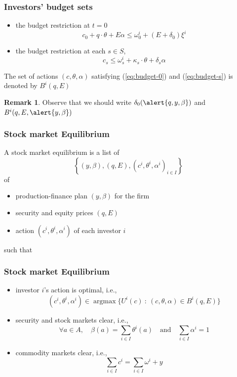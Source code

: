 \documentclass[blue]{beamer}
\def\leq{\leqslant}
\def\et{\quad \textrm{and} \quad}
\DeclareMathOperator\argmax{argmax}
\theoremstyle{definition}
\theoremstyle{example}
\newtheorem*{remark}{Remark}
\begin{document}

\begin{frame}\frametitle{Investors' budget sets}

\begin{itemize}
\item the budget restriction at $t=0$
\begin{equation}\label{eq:budget-0}
c_0 + q\cdot \theta + E \alpha \leq \omega^i_0 + (E + \delta_0) \xi^i
\end{equation}
\item the budget restriction at each $s\in S$,
\begin{equation}\label{eq:budget-s}
c_s \leq \omega^i_s + \kappa_s \cdot \theta + \delta_s \alpha
\end{equation}
\end{itemize}

The set of actions $(c,\theta,\alpha)$ satisfying (\ref{eq:budget-0}) and (\ref{eq:budget-s}) is denoted by $B^i(q,E)$
\begin{remark}
Observe that we should write $\delta_0(\alert{q,y,\beta})$ and $B^i(q,E,\alert{y,\beta})$
\end{remark}

\end{frame}


\begin{frame}\frametitle{Stock market Equilibrium}

A stock market equilibrium is a list of
\[
\left\{ (y,\beta), (q,E), (c^i,\theta^i,\alpha^i)_{i\in I}\right\}
\]
of
\begin{itemize}
\item production-finance plan $(y,\beta)$ for the firm
\item security and equity prices $(q,E)$
\item action $(c^i,\theta^i,\alpha^i)$ of each investor $i$
\end{itemize}
such that
\end{frame}


\begin{frame}\frametitle{Stock market Equilibrium}

\begin{itemize}
\item[(a)] investor $i$'s action is optimal, i.e.,
\[
(c^i,\theta^i,\alpha^i) \in \argmax \{ U^i(c) \ \colon \ (c,\theta,\alpha) \in B^i(q, E) \}
\]
\item[(b)] security and stock markets clear, i.e.,
\[
\forall a\in A, \quad \beta(a) = \sum_{i\in I} \theta^i(a) \et \sum_{i\in I} \alpha^i =1
\]
\item[(c)] commodity markets clear, i.e.,
\[
\sum_{i\in I} c^i = \sum_{i\in I} \omega^i + y
\]
\end{itemize}

\end{frame}
\end{document}
